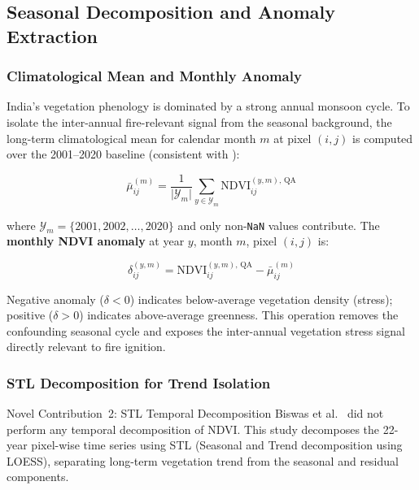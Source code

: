 \documentclass[12pt, a4paper]{article}
\begin{document}
\subsection{Seasonal Decomposition and Anomaly Extraction}
\label{sec:ndvi_decomp}

\subsubsection{Climatological Mean and Monthly Anomaly}
\label{sec:anomaly}

India's vegetation phenology is dominated by a strong annual monsoon
cycle. To isolate the inter-annual fire-relevant signal from the
seasonal background, the long-term climatological mean for calendar
month $m$ at pixel $(i,j)$ is computed over the 2001--2020 baseline
(consistent with \citealt{biswas2025}):

\begin{equation}
    \bar{\mu}_{ij}^{(m)} =
    \frac{1}{\lvert\mathcal{Y}_m\rvert}
    \sum_{y \in \mathcal{Y}_m}
    \text{NDVI}_{ij}^{(y,m),\,\text{QA}}
    \label{eq:clim_mean}
\end{equation}

where $\mathcal{Y}_m = \{2001, 2002, \ldots, 2020\}$ and only
non-\texttt{NaN} values contribute. The \textbf{monthly NDVI anomaly}
at year $y$, month $m$, pixel $(i,j)$ is:

\begin{equation}
    \boxed{
    \delta_{ij}^{(y,m)} =
    \text{NDVI}_{ij}^{(y,m),\,\text{QA}} - \bar{\mu}_{ij}^{(m)}
    }
    \label{eq:ndvi_anomaly}
\end{equation}

Negative anomaly ($\delta < 0$) indicates below-average vegetation
density (stress); positive ($\delta > 0$) indicates above-average
greenness. This operation removes the confounding seasonal cycle and
exposes the inter-annual vegetation stress signal directly relevant
to fire ignition.

\subsubsection{STL Decomposition for Trend Isolation}
\label{sec:stl}

\begin{novelbox}{Novel Contribution~2: STL Temporal Decomposition}
Biswas et al.\ \citeyearpar{biswas2025} did not perform any temporal
decomposition of NDVI. This study decomposes the 22-year pixel-wise
time series using STL (Seasonal and Trend decomposition using LOESS),
separating long-term vegetation trend from the seasonal and residual
components.
\end{novelbox}
\end{document}
